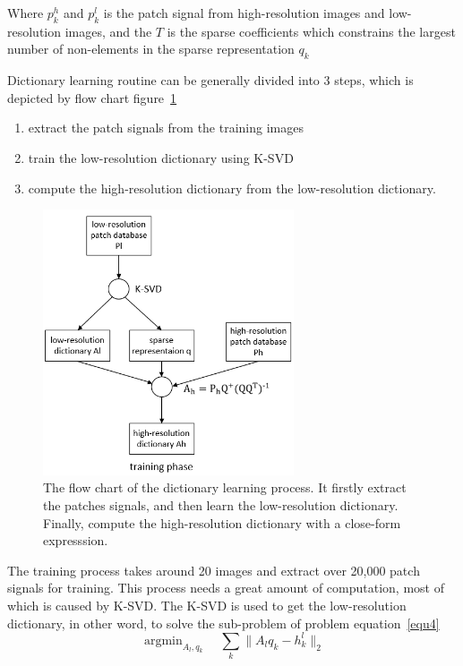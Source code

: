 \documentclass[english]{cccconf}
\begin{document}
Where \(p_k^h\) and \(p_k^l\) is the patch signal from high-resolution images and low-resolution images, and the \(T\) is the sparse coefficients which constrains the largest number of non-elements in the sparse representation \(q_k\)

Dictionary learning routine can be generally divided into 3 steps, which is depicted by flow chart figure~\ref{figh1}
\begin{enumerate}
	\item extract the patch signals from the training images
	\item train the low-resolution dictionary using K-SVD
	\item compute the high-resolution dictionary from the low-resolution dictionary.
\end{enumerate}


\begin{figure}[!htb]
	\centering
	\includegraphics[width=210pt]{2.png}
	\caption{The flow chart of the dictionary learning process. It firstly extract the patches signals, and then learn the low-resolution dictionary. Finally, compute the high-resolution dictionary with a close-form expresssion.}
	\label{figh1}
\end{figure} 


The training process takes around 20 images and extract over 20,000 patch signals for training. This process needs a great amount of computation, most of which is caused by K-SVD. The K-SVD is used to get the low-resolution dictionary, in other word, to solve the sub-problem of problem equation~\ref{equ4} 
\begin{equation}
    \mathop{\mathrm{argmin}}_{A_l,q_k}\quad\sum_k\big\lVert A_lq_k - h_k^l \big\rVert_2
	\label{equ4}
\end{equation}
\end{document}

